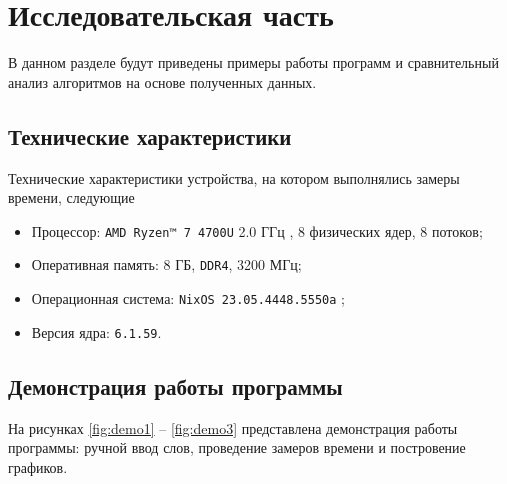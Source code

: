 \section{Исследовательская часть}

В данном разделе будут приведены примеры работы программ и сравнительный анализ алгоритмов на основе полученных данных.

\subsection{Технические характеристики}

Технические характеристики устройства, на котором выполнялись замеры времени, следующие
\begin{itemize}
    \item Процессор: \texttt{AMD Ryzen™ 7 4700U} 2.0 ГГц \cite{amd}, 8 физических ядер, 8 потоков;
    \item Оперативная память: 8 ГБ, \texttt{DDR4}, 3200 МГц;
    \item Операционная система: \texttt{NixOS 23.05.4448.5550a} \cite{nixos};
    \item Версия ядра: \texttt{6.1.59}.
\end{itemize}

\subsection{Демонстрация работы программы}

На рисунках \ref{fig:demo1} -- \ref{fig:demo3} представлена демонстрация работы программы: ручной ввод слов, проведение замеров времени и постровение графиков.

